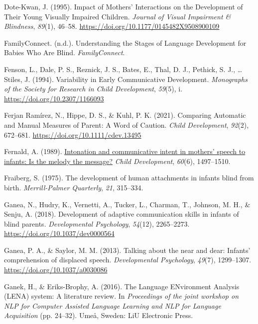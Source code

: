 \documentclass[
  man,floatsintext]{apa6}
\newlength{\cslhangindent}
\newlength{\cslentryspacingunit} %
\newenvironment{CSLReferences}[2] %
 {%
  \setlength{\parindent}{0pt}
  \ifodd #1
  \let\oldpar\par
  \def\par{\hangindent=\cslhangindent\oldpar}
  \fi
  \setlength{\parskip}{#2\cslentryspacingunit}
 }%
 {}
\begin{document}
\begin{CSLReferences}{1}{0}
\leavevmode{}%
Dote-Kwan, J. (1995). Impact of {Mothers}' {Interactions} on the {Development} of {Their Young Visually Impaired Children}. \emph{Journal of Visual Impairment \& Blindness}, \emph{89}(1), 46--58. \url{https://doi.org/10.1177/0145482X9508900109}

\leavevmode{}%
FamilyConnect. (n.d.). Understanding the {Stages} of {Language Development} for {Babies Who Are Blind}. \emph{FamilyConnect}.

\leavevmode{}%
Fenson, L., Dale, P. S., Reznick, J. S., Bates, E., Thal, D. J., Pethick, S. J., \ldots{} Stiles, J. (1994). Variability in {Early Communicative Development}. \emph{Monographs of the Society for Research in Child Development}, \emph{59}(5), i. \url{https://doi.org/10.2307/1166093}

\leavevmode{}%
Ferjan Ramírez, N., Hippe, D. S., \& Kuhl, P. K. (2021). Comparing {Automatic} and {Manual Measures} of {Parent}: {A Word} of {Caution}. \emph{Child Development}, \emph{92}(2), 672--681. \url{https://doi.org/10.1111/cdev.13495}

\leavevmode{}%
Fernald, A. (1989). \href{https://www.ncbi.nlm.nih.gov/pubmed/2612255}{Intonation and communicative intent in mothers' speech to infants: Is the melody the message?} \emph{Child Development}, \emph{60}(6), 1497--1510.

\leavevmode{}%
Fraiberg, S. (1975). The development of human attachments in infants blind from birth. \emph{Merrill-Palmer Quarterly}, \emph{21}, 315--334.

\leavevmode{}%
Ganea, N., Hudry, K., Vernetti, A., Tucker, L., Charman, T., Johnson, M. H., \& Senju, A. (2018). Development of adaptive communication skills in infants of blind parents. \emph{Developmental Psychology}, \emph{54}(12), 2265--2273. \url{https://doi.org/10.1037/dev0000564}

\leavevmode{}%
Ganea, P. A., \& Saylor, M. M. (2013). Talking about the near and dear: {Infants}' comprehension of displaced speech. \emph{Developmental Psychology}, \emph{49}(7), 1299--1307. \url{https://doi.org/10.1037/a0030086}

\leavevmode{}%
Ganek, H., \& Eriks-Brophy, A. (2016). The {Language ENvironment Analysis} ({LENA}) system: {A} literature review. In \emph{Proceedings of the joint workshop on {NLP} for {Computer Assisted Language Learning} and {NLP} for {Language Acquisition}} (pp. 24--32). {Umeå, Sweden}: {LiU Electronic Press}.


\end{CSLReferences}
\end{document}
